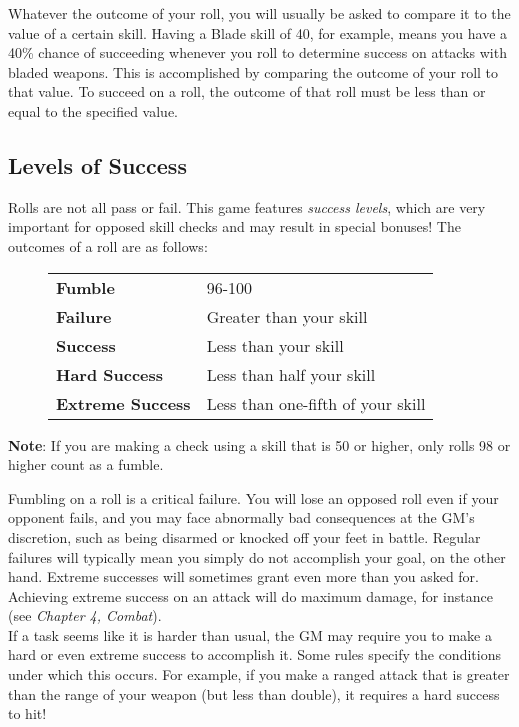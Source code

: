 Whatever the outcome of your roll, you will usually be asked to compare it to the value of a certain skill. Having a Blade skill of 40, for example, means you have a 40\% chance of succeeding whenever you roll to determine success on attacks with bladed weapons. This is accomplished by comparing the outcome of your roll to that value. To succeed on a roll, the outcome of that roll must be less than or equal to the specified value.

\subsection{Levels of Success}
Rolls are not all pass or fail. This game features \textit{success levels}, which are very important for opposed skill checks and may result in special bonuses! The outcomes of a roll are as follows:

\begin{figure}[h]
\begin{tabular}{p{}p{}}
	\rowcolor{gray!25}
	\textbf{Fumble} & 96-100\\
	\textbf{Failure} & Greater than your skill\\
	\textbf{Success} & Less than your skill\\
	\textbf{Hard Success} & Less than half your skill\\
	\textbf{Extreme Success} & Less than one-fifth of your skill\\
\end{tabular}
\end{figure}

\begin{tcolorbox}
	\textbf{Note}: If you are making a check using a skill that is 50 or higher, only rolls 98 or higher count as a fumble.
\end{tcolorbox}

Fumbling on a roll is a critical failure. You will lose an opposed roll even if your opponent fails, and you may face abnormally bad consequences at the GM's discretion, such as being disarmed or knocked off your feet in battle. Regular failures will typically mean you simply do not accomplish your goal, on the other hand. Extreme successes will sometimes grant even more than you asked for. Achieving extreme success on an attack will do maximum damage, for instance (see \textit{Chapter 4, Combat}).\\

If a task seems like it is harder than usual, the GM may require you to make a hard or even extreme success to accomplish it. Some rules specify the conditions under which this occurs. For example, if you make a ranged attack that is greater than the range of your weapon (but less than double), it requires a hard success to hit!

